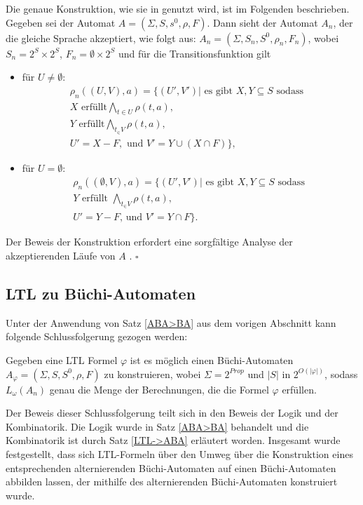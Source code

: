 Die genaue Konstruktion, wie sie in \cite{vardi+96} genutzt wird, ist im Folgenden beschrieben. Gegeben sei der Automat $A=(\Sigma,S, s^0, \rho, F)$. Dann sieht der Automat $A_n$, der die gleiche Sprache akzeptiert, wie folgt aus: $A_n=(\Sigma,S_n,S^0,\rho_n,F_n)$, wobei $S_n=2^S\times2^S$, $F_n={\emptyset}\times2^S$ und für die Transitionsfunktion gilt \begin{itemize}
\item für $U\neq\emptyset$:
\begin{align*}
\rho_n((U,V),a)=\{(U',V')| \text{ es gibt } X,Y\subseteq S\text{ sodass}&\\
X \text{ erfüllt} \bigwedge_{t \in U}\rho(t,a),\\
Y \text{ erfüllt} \bigwedge_{t_\in V}\rho(t,a),\\
U'=X-F, \text{ und } V'=Y\cup(X\cap F)\},
\end{align*}
\item für $U=\emptyset$:
\begin{align*}
\rho_n((\emptyset,V),a)=\{(U',V')|\text{ es gibt } X,Y\subseteq S \text{ sodass }\\
Y \text{ erfüllt } \bigwedge_{t_\in V}\rho(t,a),\\
U'=Y-F\text{, und } V'=Y\cap F\}.
\end{align*}
\end{itemize}
Der Beweis der Konstruktion erfordert eine sorgfältige Analyse der akzeptierenden Läufe von $A$ \cite{vardi+96}.
$\square$



\subsection{LTL zu Büchi-Automaten}

Unter der Anwendung von Satz \ref{ABA>BA} aus dem vorigen Abschnitt kann folgende Schlussfolgerung gezogen werden:

\begin{korol}\cite{vardi+96,vardi+94}
Gegeben eine LTL Formel $\varphi$ ist es möglich einen Büchi-Automaten $A_{\varphi}=(\Sigma,S, S^0,\rho,F)$ zu konstruieren, wobei $\Sigma=2^{Prop}$ und $|S|$ in $2^{O(|\varphi|)}$, sodass $L_{\omega}(A_n)$ genau die Menge der Berechnungen, die die Formel $\varphi$ erfüllen.
\end{korol}

Der Beweis dieser Schlussfolgerung teilt sich in den Beweis der Logik und der Kombinatorik. Die Logik wurde in Satz \ref{ABA>BA} behandelt und die Kombinatorik ist durch Satz \ref{LTL->ABA} erläutert worden. Insgesamt wurde festgestellt, dass sich LTL-Formeln über den Umweg über die Konstruktion eines entsprechenden alternierenden Büchi-Automaten auf einen Büchi-Automaten abbilden lassen, der mithilfe des alternierenden Büchi-Automaten konstruiert wurde.

